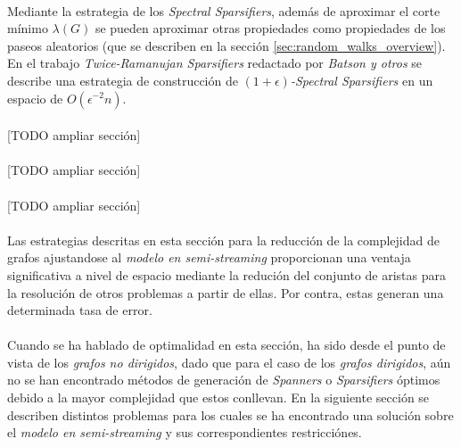 \documentclass{subfiles}
\begin{document}
        \paragraph{}
        Mediante la estrategia de los \emph{Spectral Sparsifiers}, además de aproximar el corte mínimo $\lambda(G)$ se pueden aproximar otras propiedades como propiedades de los paseos aleatorios (que se describen en la sección \ref{sec:random_walks_overview}). En el trabajo \emph{Twice-Ramanujan Sparsifiers} \cite{batson2012twice} redactado por \emph{Batson y otros} se describe una estrategia de construcción de \emph{$(1 +\epsilon)$-Spectral Sparsifiers} en un espacio de $O(\epsilon^{-2}n)$.

        \paragraph{}
        [TODO ampliar sección]

        \paragraph{}
        [TODO ampliar sección]

        \paragraph{}
        [TODO ampliar sección]

      \paragraph{}
      Las estrategias descritas en esta sección para la reducción de la complejidad de grafos ajustandose al \emph{modelo en semi-streaming} proporcionan una ventaja significativa a nivel de espacio mediante la redución del conjunto de aristas para la resolución de otros problemas a partir de ellas. Por contra, estas generan una determinada tasa de error.

      \paragraph{}
      Cuando se ha hablado de optimalidad en esta sección, ha sido desde el punto de vista de los \emph{grafos no dirigidos}, dado que para el caso de los \emph{grafos dirigidos}, aún no se han encontrado métodos de generación de \emph{Spanners} o \emph{Sparsifiers} óptimos debido a la mayor complejidad que estos conllevan. En la siguiente sección se describen distintos problemas para los cuales se ha encontrado una solución sobre el \emph{modelo en semi-streaming} y sus correspondientes restricciónes.
\end{document}
